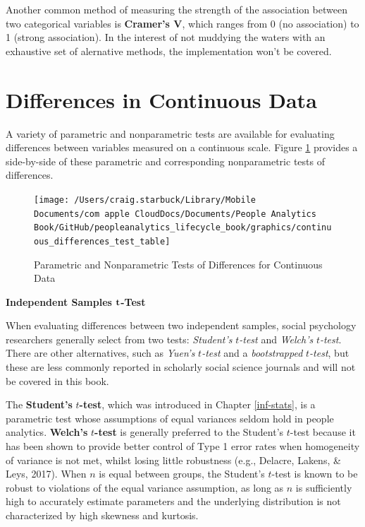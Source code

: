 \documentclass[
]{book}
\begin{document}
Another common method of measuring the strength of the association between two categorical variables is \textbf{Cramer's V}, which ranges from 0 (no association) to 1 (strong association). In the interest of not muddying the waters with an exhaustive set of alernative methods, the implementation won't be covered.

\hypertarget{differences-in-continuous-data}{%
\section{Differences in Continuous Data}\label{differences-in-continuous-data}}

A variety of parametric and nonparametric tests are available for evaluating differences between variables measured on a continuous scale. Figure \ref{fig:continuous-tests} provides a side-by-side of these parametric and corresponding nonparametric tests of differences.

\begin{figure}

{\centering \texttt{[image: /Users/craig.starbuck/Library/Mobile Documents/com~apple~CloudDocs/Documents/People Analytics Book/GitHub/peopleanalytics\_lifecycle\_book/graphics/continuous\_differences\_test\_table]} 

}

\caption{Parametric and Nonparametric Tests of Differences for Continuous Data}\label{fig:continuous-tests}
\end{figure}

\textbf{Independent Samples }\(\textbf t\)\textbf{-Test}

When evaluating differences between two independent samples, social psychology researchers generally select from two tests: \emph{Student's} \(t\)\emph{-test} and \emph{Welch's} \(t\)\emph{-test}. There are other alternatives, such as \emph{Yuen's} \(t\)\emph{-test} and a \emph{bootstrapped} \(t\)\emph{-test}, but these are less commonly reported in scholarly social science journals and will not be covered in this book.

The \textbf{Student's} \(t\)\textbf{-test}, which was introduced in Chapter \ref{inf-stats}, is a parametric test whose assumptions of equal variances seldom hold in people analytics. \textbf{Welch's} \(t\)\textbf{-test} is generally preferred to the Student's \(t\)-test because it has been shown to provide better control of Type 1 error rates when homogeneity of variance is not met, whilst losing little robustness (e.g., Delacre, Lakens, \& Leys, 2017). When \(n\) is equal between groups, the Student's \(t\)-test is known to be robust to violations of the equal variance assumption, as long as \(n\) is sufficiently high to accurately estimate parameters and the underlying distribution is not characterized by high skewness and kurtosis.
\end{document}
